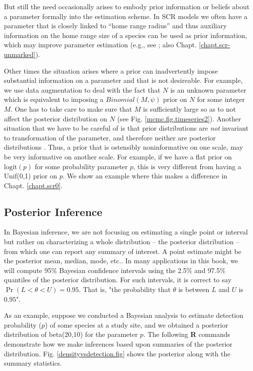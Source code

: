 But still the need occasionally arises to embody prior information or
beliefs about a parameter formally into the estimation scheme.
 In SCR models we often have a parameter that is closely linked
to ``home range radius'' and thus auxiliary information on the home
range size of a species can be used as prior information, which may improve parameter estimation (e.g., see
\citet{chandler_royle:2012} ; also Chapt. \ref{chapt.scr-unmarked}).

Other times the situation arises where a prior can inadvertently impose
substantial information on a parameter and that is not desireable.
For example, we use data augmentation
to deal with the fact that $N$ is an unknown parameter
 \citep{royle_etal:2007} which is equivalent to imposing a $Binomial(M,\psi)$
 prior on $N$ for some integer $M$. One has to take care to make sure
 that $M$ is sufficiently large so as to not affect the posterior
 distribution on $N$ (see Fig. \ref{mcmc.fig.timeseries2}).
Another situation that we have
 to be careful of is that
prior 
distributions are {\it not} invariant to transformation of the
parameter,
and therefore neither are posterior distributions
\citep[][sec. 6.2.1]{link_barker:2010}. Thus, a prior that is ostensibly
noninformative on one scale, may be very informative on another
scale. 
For example, if we have a flat prior on $\mbox{logit}(p)$ for some probability
parameter $p$, this is very different from having a 
\mbox{Unif}(0,1) prior 
on $p$. We show an example where this makes a difference in Chapt. \ref{chapt.scr0}.

\subsection{Posterior Inference}

In Bayesian inference, we are not focusing on estimating a single
point or interval but rather on characterizing a whole distribution --
the posterior distribution -- from which one can report any summary of
interest. A point estimate might be the posterior mean, median, mode,
etc..  In many applications in this book, we will compute 95\%
Bayesian confidence intervals using the 2.5\% and 97.5\% quantiles of the
posterior distribution. For such intervals, it is correct to say
$\Pr(L < \theta < U) = 0.95$. That is, "the probability that $\theta$
is between $L$ and $U$ is $0.95$". 

As an
example, suppose we conducted a Bayesian analysis to estimate
detection probability ($p$) of some species at a study site, and we
obtained a posterior distribution of beta(20,10) for the parameter
$p$. The following {\bf R} commands demonstrate how we make inferences based
upon summaries of the posterior distribution. Fig. \ref{densityvsdetection.fig} shows the
posterior along with the summary statistics.

